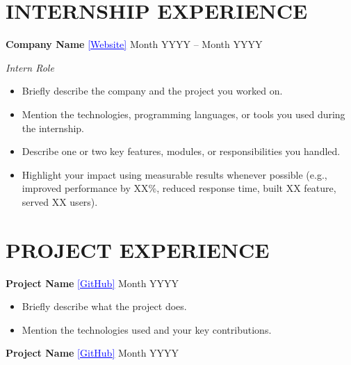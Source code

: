 \documentclass[10pt,a4paper]{article}
\begin{document}
\section*{INTERNSHIP EXPERIENCE}

\textbf{Company Name}
\href{https://company-website.com}
{\textcolor{blue}{[\underline{Website}]}}
\hfill Month YYYY -- Month YYYY

\textit{Intern Role}

\begin{itemize}[leftmargin=0.2in,itemsep=2pt]

\item Briefly describe the company and the project you worked on.

\item Mention the technologies, programming languages, or tools you used during the internship.

\item Describe one or two key features, modules, or responsibilities you handled.

\item Highlight your impact using measurable results whenever possible (e.g., improved performance by XX\%, reduced response time, built XX feature, served XX users).

\end{itemize}

\section*{PROJECT EXPERIENCE}

\textbf{Project Name}
\href{https://github.com/yourusername/project}
{\textcolor{blue}{[\underline{GitHub}]}}
\hfill Month YYYY

\begin{itemize}[leftmargin=0.2in,itemsep=2pt]

\item Briefly describe what the project does.

\item Mention the technologies used and your key contributions.

\end{itemize}

\vspace{4pt}

\textbf{Project Name}
\href{https://github.com/yourusername/project}
{\textcolor{blue}{[\underline{GitHub}]}}
\hfill Month YYYY
\end{document}
